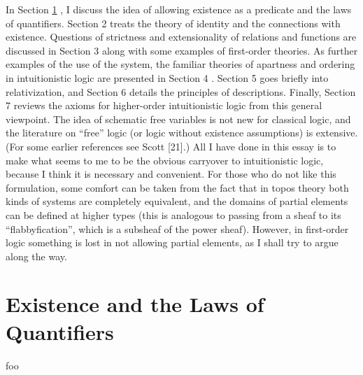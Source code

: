In Section \ref{sec1} , I discuss the idea of allowing existence as a predicate and
the laws of quantifiers. Section 2 treats the theory of identity and the connections with existence. Questions of strictness and extensionality of relations and functions are discussed in Section 3 along with some examples of first-order theories. As further examples of the use of the system, the familiar theories of apartness and ordering in intuitionistic logic are presented in Section 4 . Section 5 goes briefly into relativization, and Section 6 details the principles of descriptions. Finally, Section 7 reviews the axioms for higher-order intuitionistic logic from this general viewpoint.
The idea of schematic free variables is not new for classical logic, and the literature on ``free'' logic (or logic without existence assumptions) is extensive.
(For some earlier references see Scott [21].) All I have done in this essay is
to make what seems to me to be the obvious carryover to intuitionistic logic,
because I think it is necessary and convenient. For those who do not like this formulation, some comfort can be taken from the fact that in topos theory both kinds of systems are completely equivalent, and the domains of partial elements can be defined at higher types (this is analogous to passing from a sheaf to its ``flabbyfication'', which is a subsheaf of the power sheaf). However, in first-order logic something is lost in not allowing partial elements, as I shall try to argue along
the way.

\section{Existence and the Laws of Quantifiers}\label{sec1}

foo

\begin{thebibliography}{86}


\end{thebibliography}
